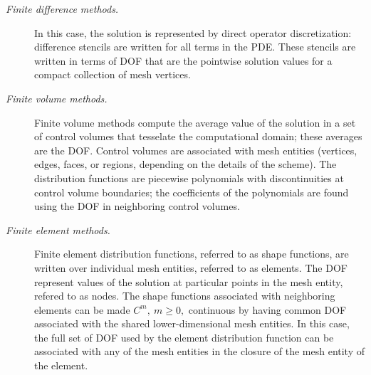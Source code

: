 
\begin{description}
\item[{\it Finite difference methods.}]  In this case, the solution is 
represented by direct operator discretization: difference stencils are
written for all terms in the PDE.  These stencils are written in terms
of DOF that are the pointwise solution values for a compact collection
of mesh vertices.

\item[{\it Finite volume methods.}]  Finite volume methods compute the average
value of the solution in a set of control volumes that tesselate the
computational domain; these averages are the DOF.  Control volumes are
associated with mesh entities (vertices, edges, faces, or regions,
depending on the details of the scheme).  The distribution functions are
piecewise polynomials with discontinuities at control volume boundaries;
the coefficients of the polynomials are found using the DOF in
neighboring control volumes.


\item [{\it Finite element methods.}]
Finite element distribution functions, referred to as shape functions,
are written over individual mesh entities, referred to as elements.  The
DOF represent values of the solution at particular points in the mesh
entity, refered to as nodes.  The shape functions associated with
neighboring elements can be made $C^m,~m \geq 0,$ continuous by having
common DOF associated with the shared lower-dimensional mesh entities.
In this case, the full set of DOF used by the element distribution
function can be associated with any of the mesh entities in the
closure of the mesh entity of the element.
\end{description}

